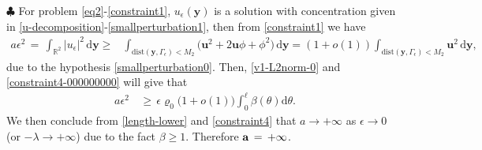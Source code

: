 \documentclass[10pt, reqno]{amsart}
\numberwithin{equation}{section}
\theoremstyle{definition}
\begin{document}
{{\noindent $\clubsuit$
 For problem \eqref{eq2}-\eqref{constraint1}, $u_\epsilon({\mathbf y})$ is a solution with concentration given in \eqref{u-decomposition}-\eqref{smallperturbation1},
 then from \eqref{constraint1} we have
\begin{align}\label{constraint4-000000000}
 a\epsilon^2
 \,=\,
 \int_{{\mathbb R}^2} |u_\epsilon|^2 \,{\mathrm d}{\mathbf y}
 \geq&\int_{{\mathrm{dist}} ({\mathbf y}, \Gamma_\epsilon) <M_2} \Big({\mathbf u}^2 + 2 {\mathbf u} \phi+ \phi^2 \Big) \,{\mathrm d}{\mathbf y}
 =
\left(1 + o(1)\right) \int_{{\mathrm{dist}} ({\mathbf y}, \Gamma_\epsilon) <M_2} {\mathbf u}^2\,{\mathrm d}{\mathbf y},
\end{align}
 due to the hypothesis \eqref{smallperturbation0}.
 Then, \eqref{v1-L2norm-0} and \eqref{constraint4-000000000} will give that
\begin{align} \label{constraint4}
 a\epsilon^2
 & \,\geq\, \epsilon {\varrho_0}\big(1+o(1)\big)\int_0^{\ell} \beta(\theta) {\mathrm d}\theta.
\end{align}
 We then conclude from \eqref{length-lower} and \eqref{constraint4} that $a \to +\infty $ as $\epsilon \to 0$ (or $-\lambda\to +\infty$)
 due to the fact $\beta\geq 1$.
 Therefore ${\bf a} \,=\, + \infty$.



}}
\end{document}
